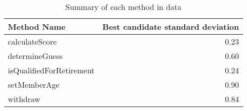 \begin{table}[ht]
\centering
\begin{tabular}{lr}
  \hline
Method Name & Best candidate standard deviation \\ 
  \hline
calculateScore & 0.23 \\ 
  determineGuess & 0.60 \\ 
  isQualifiedForRetirement & 0.24 \\ 
  setMemberAge & 0.90 \\ 
  withdraw & 0.84 \\ 
   \hline
\end{tabular}
\caption{Summary of each method in data} 
\label{table:each_method_summary 3}
\end{table}
